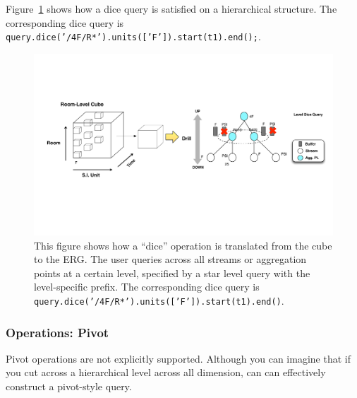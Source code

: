 
Figure~\ref{fig:olapdice2ergdice}
shows how a dice query is satisfied on a hierarchical structure.  The corresponding dice query 
is \texttt{query.dice('/4F/R*').units(['F']).start(t1).end();}.


\begin{figure}[h!] %
\centering
\includegraphics[width=1.0\columnwidth]{figs/olapdice2ergdice}
\caption{This figure shows how a ``dice'' operation is translated from the cube to the ERG.  The user queries across all streams or aggregation
points at a certain level, specified by a star level query with the level-specific prefix.  The corresponding dice query is
\texttt{query.dice('/4F/R*').units(['F']).start(t1).end()}.}
\label{fig:olapdice2ergdice}
\end{figure}




\subsubsection{Operations: Pivot}
Pivot operations are not explicitly supported.  Although you can imagine that if you cut across a hierarchical level across all dimension, can
can effectively construct a pivot-style query.



